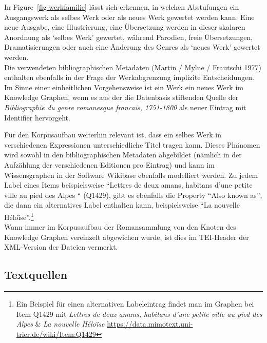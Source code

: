 \documentclass[
  12pt,
  letterpaper,
  DIV=11,
  numbers=noendperiod]{scrreprt}
\begin{document}
In Figure~\ref{fig-werkfamilie} lässt sich erkennen, in welchen
Abstufungen ein Ausgangswerk als selbes Werk oder als neues Werk
gewertet werden kann. Eine neue Ausgabe, eine Illustrierung, eine
Übersetzung werden in dieser skalaren Anordnung als `selbes Werk'
gewertet, während Parodien, freie Übersetzungen, Dramatisierungen oder
auch eine Änderung des Genres als `neues Werk' gewertet werden.\\
Die verwendeten bibliographischen Metadaten (Martin / Mylne / Frautschi
1977) enthalten ebenfalls in der Frage der Werkabgrenzung implizite
Entscheidungen. Im Sinne einer einheitlichen Vorgehensweise ist ein Werk
ein neues Werk im Knowledge Graphen, wenn es aus der die Datenbasis
stiftenden Quelle der \emph{Bibliographie du genre romanesque francais,
1751-1800} als neuer Eintrag mit Identifier hervorgeht.

Für den Korpusaufbau weiterhin relevant ist, dass ein selbes Werk in
verschiedenen Expressionen unterschiedliche Titel tragen kann. Dieses
Phänomen wird sowohl in den bibliographischen Metadaten abgebildet
(nämlich in der Aufzählung der verschiedenen Editionen pro Eintrag) und
kann im Wissensgraphen in der Software Wikibase ebenfalls modelliert
werden. Zu jedem Label eines Items beispielsweise ``Lettres de deux
amans, habitans d'une petite ville au pied des Alpes `` (Q1429), gibt es
ebenfalls die Property ``Also known as'', die dann ein alternatives
Label enthalten kann, beispielsweise ``La nouvelle
Héloi͏̈se''.\footnote{Ein Beispiel für einen alternativen Labeleintrag
  findet man im Graphen bei Item Q1429 mit \emph{Lettres de deux amans,
  habitans d'une petite ville au pied des Alpes} \& \emph{La nouvelle
  Héloi͏̈se} \url{https://data.mimotext.uni-trier.de/wiki/Item:Q1429}}\\
Wann immer im Korpusaufbau der Romansammlung von den Knoten des
Knowledge Graphen vereinzelt abgewichen wurde, ist dies im TEI-Header
der XML-Version der Dateien vermerkt.

\subsection{Textquellen}\label{textquellen}
\end{document}
